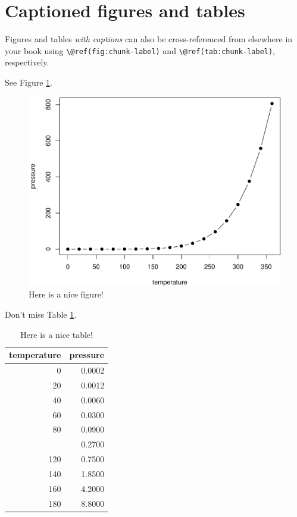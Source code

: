 \documentclass[
]{book}
\theoremstyle{definition}
\theoremstyle{definition}
\theoremstyle{definition}
\theoremstyle{definition}
\theoremstyle{remark}
\begin{document}
\hypertarget{captioned-figures-and-tables}{%
\section{Captioned figures and tables}\label{captioned-figures-and-tables}}

Figures and tables \emph{with captions} can also be cross-referenced from elsewhere in your book using \texttt{\textbackslash{}@ref(fig:chunk-label)} and \texttt{\textbackslash{}@ref(tab:chunk-label)}, respectively.

See Figure \ref{fig:nice-fig}.

\begin{figure}

{\centering \includegraphics[width=0.8\linewidth]{_main_files/figure-latex/nice-fig-1} 

}

\caption{Here is a nice figure!}\label{fig:nice-fig}
\end{figure}

Don't miss Table \ref{tab:nice-tab}.

\begin{table}

\caption{\label{tab:nice-tab}Here is a nice table!}
\centering
\begin{tabular}[t]{rr}
\toprule
temperature & pressure\\
\midrule
0 & 0.0002\\
20 & 0.0012\\
40 & 0.0060\\
60 & 0.0300\\
80 & 0.0900\\
\addlinespace
100 & 0.2700\\
120 & 0.7500\\
140 & 1.8500\\
160 & 4.2000\\
180 & 8.8000\\
\bottomrule
\end{tabular}
\end{table}
\end{document}
